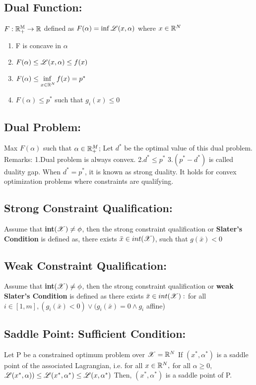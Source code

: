 \documentclass[a4paper,english,12pt]{article}
\begin{document}
{{\subsection{Dual Function:}
$F:\mathbb{R^M_+}\to\mathbb{R}$ defined as $F(\alpha) = \inf\mathscr{L}(x,\alpha)$ where $x\in \mathbb{R}^N$
\begin{rem}
\begin{enumerate}
\item F is concave in $\alpha$
\item $F(\alpha) \leq \mathscr{L}(x,\alpha)\leq f(x)$
\item $F(\alpha)  \leq \adjustlimits \inf_{x\in \R^N} f(x) = p^*$
\item $F(\alpha) \leq p^*$ such that $g_i(x) \leq 0$
\end{enumerate}
\end{rem}
\subsection{Dual Problem:}
Max $F(\alpha)$ such that $\alpha \in \mathbb{R}_+^M$; Let $d^*$ be the optimal value of this dual problem.
Remarks:
1.Dual problem is always convex.
2.$d^* \leq p^*$
3.$(p^* - d^*)$ is called duality gap. When $d^* = p^*$, it is known as strong duality. It holds for convex optimization problems where constraints are qualifying. 

\subsection{Strong Constraint Qualification:}
Assume that \textbf{int}$(\mathscr{X}) \neq \phi$, then the strong constraint qualification or \textbf{Slater's Condition} is defined as, 
there exists $\bar{x} \in int(\mathscr{X})$, such that $g(\bar x) < 0$
\subsection{Weak Constraint Qualification:}
Assume that \textbf{int}$(\mathscr{X}) \neq \phi$, then the strong constraint qualification or \textbf{weak Slater's Condition} is defined as there exists $\bar{x} \in int(\mathscr{X}):$ for all $ i \in [1,m],(g_i(\bar x) < 0)\vee(g_i(\bar x) = 0 \wedge g_i$ affine)
\subsection{Saddle Point: Sufficient Condition:}
Let P be a constrained optimum problem over $\mathscr{X} = \mathbb{R}^N$ If $(x^*,\alpha^*)$ is a saddle point of the associated Lagrangian, i.e. for all $ x\in \mathbb{R}^N, $ for all $\alpha\geq0,$
$\mathscr{L}(x^*,\alpha)) \leq \mathscr{L}(x^*,\alpha^*)\leq \mathscr{L}(x,\alpha^*)$
Then, $(x^*,\alpha^*)$ is a saddle point of P.
}}
\end{document}
